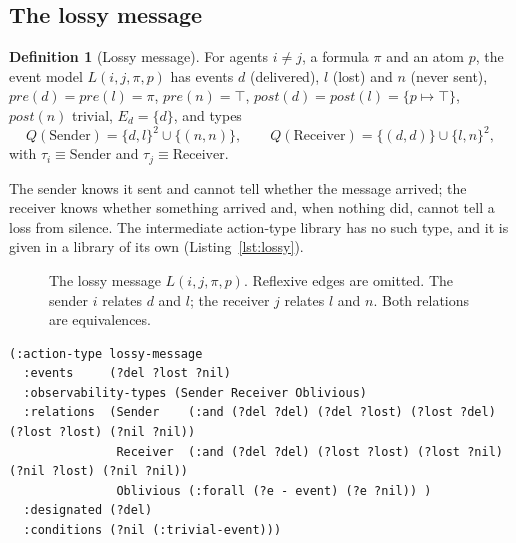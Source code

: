 \documentclass[11pt,a4paper]{article}
\theoremstyle{definition}
\newtheorem{definition}{Definition}
\newcommand{\code}[1]{\texttt{\small #1}}
\newcommand{\pre}{\mathit{pre}}
\newcommand{\post}{\mathit{post}}
\begin{document}
\subsection{The lossy message}

\begin{definition}[Lossy message]
\label{def:lossy}
For agents $i \neq j$, a formula $\pi$ and an atom $p$, the event model
$L(i,j,\pi,p)$ has events $d$ (delivered), $l$ (lost) and $n$ (never sent),
$\pre(d) = \pre(l) = \pi$, $\pre(n) = \top$, $\post(d) = \post(l) = \{p \mapsto
\top\}$, $\post(n)$ trivial, $E_d = \{d\}$, and types
\[
  Q(\mathrm{Sender}) = \{d,l\}^2 \cup \{(n,n)\},\qquad
  Q(\mathrm{Receiver}) = \{(d,d)\} \cup \{l,n\}^2,
\]
with $\tau_i \equiv \mathrm{Sender}$ and $\tau_j \equiv \mathrm{Receiver}$.
\end{definition}

The sender knows it sent and cannot tell whether the message arrived; the
receiver knows whether something arrived and, when nothing did, cannot tell a
loss from silence. The intermediate action-type library has no such type, and
it is given in a library of its own (Listing~\ref{lst:lossy}).

\begin{figure}[H]
\centering
{}
\caption{The lossy message $L(i,j,\pi,p)$. Reflexive edges are omitted. The
sender $i$ relates $d$ and $l$; the receiver $j$ relates $l$ and $n$. Both
relations are equivalences.}
\label{fig:lossy}
\end{figure}

\begin{lstlisting}[caption={The action type, in \code{epddl/lossy.epddl}.}, label={lst:lossy}]
(:action-type lossy-message
  :events     (?del ?lost ?nil)
  :observability-types (Sender Receiver Oblivious)
  :relations  (Sender    (:and (?del ?del) (?del ?lost) (?lost ?del) (?lost ?lost) (?nil ?nil))
               Receiver  (:and (?del ?del) (?lost ?lost) (?lost ?nil) (?nil ?lost) (?nil ?nil))
               Oblivious (:forall (?e - event) (?e ?nil)) )
  :designated (?del)
  :conditions (?nil (:trivial-event)))
\end{lstlisting}
\end{document}
